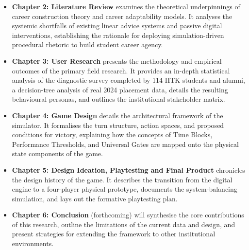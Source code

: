 \begin{itemize}
  \setlength\itemsep{0.4em}
  \item \textbf{Chapter 2: Literature Review} examines the theoretical underpinnings of career construction theory and career adaptability models. It analyses the systemic shortfalls of existing linear advice systems and passive digital interventions, establishing the rationale for deploying simulation-driven procedural rhetoric to build student career agency.

  \item \textbf{Chapter 3: User Research} presents the methodology and empirical outcomes of the primary field research. It provides an in-depth statistical analysis of the diagnostic survey completed by 114 IITK students and alumni, a decision-tree analysis of real 2024 placement data, details the resulting behavioural personas, and outlines the institutional stakeholder matrix.

  \item \textbf{Chapter 4: Game Design} details the architectural framework of the simulator. It formalises the turn structure, action spaces, and proposed conditions for victory, explaining how the concepts of Time Blocks, Performance Thresholds, and Universal Gates are mapped onto the physical state components of the game.

  \item \textbf{Chapter 5: Design Ideation, Playtesting and Final Product} chronicles the design history of the game. It describes the transition from the digital engine to a four-player physical prototype, documents the system-balancing simulation, and lays out the formative playtesting plan.

  \item \textbf{Chapter 6: Conclusion} (forthcoming) will synthesise the core contributions of this research, outline the limitations of the current data and design, and present strategies for extending the framework to other institutional environments.
\end{itemize}